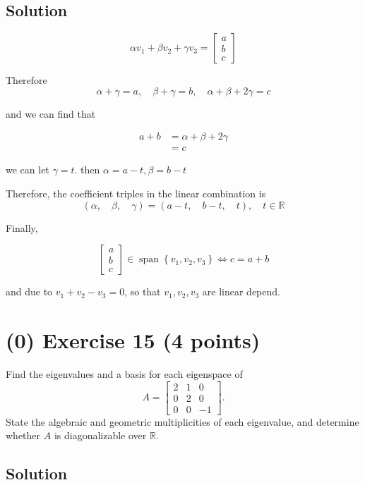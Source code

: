 \documentclass[12pt,a4paper]{article}
\begin{document}
\subsection*{Solution}

\[
\alpha v_1 + \beta v_2 + \gamma v_3 = \begin{bmatrix}
	a \\ b \\ c
\end{bmatrix}
\]

Therefore 
\[
\alpha + \gamma = a, \quad \beta + \gamma = b, \quad \alpha + \beta + 2\gamma = c 
\]

and we can find that 

\begin{align*}
	a + b &= \alpha + \beta + 2\gamma \\ & = c
\end{align*}

we can let $\gamma = t$. then $\alpha = a - t, \beta = b - t$

Therefore, the coefficient triples in the linear combination is
\[
(\alpha, \quad \beta,\quad \gamma) = (a -t, \quad b - t , \quad t),\quad t\in \mathbb R
\]

Finally, 

\[
\begin{bmatrix}
	a \\ b \\ c
\end{bmatrix} \in \operatorname{span} \left\{ v_1, v_2, v_3 \right\} \Leftrightarrow c = a + b
\]

and due to $v_1 + v_2 - v_3 = 0$, so that $v_1, v_2, v_3$ are linear depend.

\vspace{3cm}
\clearpage
\section*{(0) Exercise 15 \hfill {\normalsize (4 points)}}
Find the eigenvalues and a basis for each eigenspace of
\[
A=\begin{bmatrix}2&1&0\\0&2&0\\0&0&-1\end{bmatrix}.
\]
State the algebraic and geometric multiplicities of each eigenvalue, and determine whether $A$ is diagonalizable over $\mathbb R$.
\subsection*{Solution}
\end{document}
